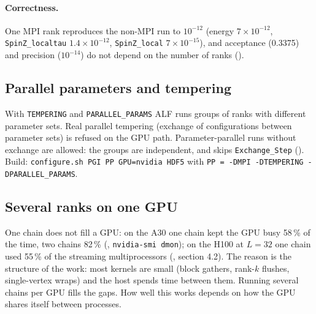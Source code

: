 
\paragraph{Correctness.} One MPI rank reproduces the non-MPI run to $10^{-12}$ (energy $7\times10^{-12}$, \texttt{SpinZ\_localtau} $1.4\times10^{-12}$, \texttt{SpinZ\_local} $7\times10^{-15}$), and acceptance (0.3375) and precision ($10^{-14}$) do not depend on the number of ranks (). %

\subsection{Parallel parameters and tempering}

With \texttt{TEMPERING} and \texttt{PARALLEL\_PARAMS} ALF runs groups of ranks with different parameter sets. Real parallel tempering (exchange of configurations between parameter sets) is refused on the GPU path. Parameter-parallel runs without exchange are allowed: the groups are independent, and  skips \texttt{Exchange\_Step} (). Build: \texttt{configure.sh PGI PP GPU=nvidia HDF5} with \texttt{PP = -DMPI -DTEMPERING -DPARALLEL\_PARAMS}.

\subsection{Several ranks on one GPU}

One chain does not fill a GPU: on the A30 one chain kept the GPU busy 58\,\% of the time, two chains 82\,\% (, \texttt{nvidia-smi dmon}); on the H100 at $L=32$ one chain used 55\,\% of the streaming multiprocessors (, section 4.2). %
The reason is the structure of the work: most kernels are small (block gathers, rank-$k$ flushes, single-vertex wraps) and the host spends time between them. Running several chains per GPU fills the gaps. How well this works depends on how the GPU shares itself between processes.

